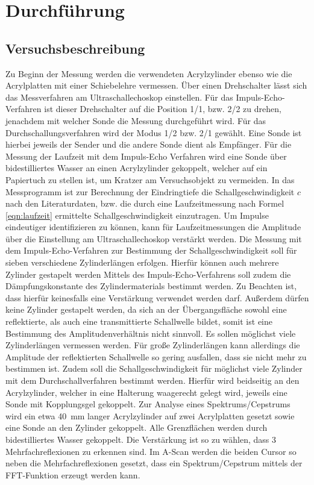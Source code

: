 \section{Durchführung}
\label{sec:Durchführung}



\subsection{Versuchsbeschreibung}
\label{sec:Versuchsbeschreibung}
Zu Beginn der Messung werden die verwendeten Acrylzylinder ebenso wie die Acrylplatten mit einer Schiebelehre vermessen.
Über einen Drehschalter lässt sich das Messverfahren am Ultraschallechoskop einstellen.
Für das Impuls-Echo-Verfahren ist dieser Drehschalter auf die Position 1/1, bzw. 2/2 zu drehen, jenachdem mit welcher Sonde die Messung durchgeführt wird.
Für das Durchschallungsverfahren wird der Modus 1/2 bzw. 2/1 gewählt.
Eine Sonde ist hierbei jeweils der Sender und die andere Sonde dient als Empfänger.
Für die Messung der Laufzeit mit dem Impuls-Echo Verfahren wird eine Sonde über bidestilliertes Wasser an einen Acrylzylinder gekoppelt, welcher auf ein Papiertuch zu stellen ist, um Kratzer am Versuchsobjekt zu vermeiden.
In das Messprogramm ist zur Berechnung der Eindringtiefe die Schallgeschwindigkeit $c$ nach den Literaturdaten, bzw. die durch eine Laufzeitmessung nach Formel \eqref{eqn:laufzeit} ermittelte Schallgeschwindigkeit einzutragen.
Um Impulse eindeutiger identifizieren zu können, kann für Laufzeitmessungen die Amplitude über die Einstellung am Ultraschallechoskop verstärkt werden.
Die Messung mit dem Impuls-Echo-Verfahren zur Bestimmung der Schallgeschwindigkeit soll für sieben verschiedene Zylinderlängen erfolgen. Hierfür können auch mehrere Zylinder gestapelt werden
Mittels des Impuls-Echo-Verfahrens soll zudem die Dämpfungskonstante des Zylindermaterials bestimmt werden. Zu Beachten ist, dass hierfür keinesfalls eine Verstärkung verwendet werden darf. Außerdem dürfen keine Zylinder gestapelt werden, da sich an der Übergangsfläche sowohl eine reflektierte, als auch eine transmittierte Schallwelle bildet, somit ist eine Bestimmung des Amplitudenverhältnis nicht sinnvoll.
Es sollen möglichst viele Zylinderlängen vermessen werden. Für große Zylinderlängen kann allerdings die Amplitude der reflektierten Schallwelle so gering ausfallen, dass sie nicht mehr zu bestimmen ist.
Zudem soll die Schallgeschwindigkeit für möglichst viele Zylinder mit dem Durchschallverfahren bestimmt werden. Hierfür wird beidseitig an den Acrylzylinder, welcher in eine Halterung waagerecht gelegt wird, jeweils eine Sonde mit Kopplungsgel gekoppelt.
Zur Analyse eines Spektrums/Cepstrums wird ein etwa \SI{40}{\milli\meter} langer Acrylzylinder auf zwei Acrylplatten gesetzt sowie eine Sonde an den Zylinder gekoppelt.
Alle Grenzflächen werden durch bidestilliertes Wasser gekoppelt. Die Verstärkung ist so zu wählen, dass 3 Mehrfachreflexionen zu erkennen sind.
Im A-Scan werden die beiden Cursor so neben die Mehrfachreflexionen gesetzt, dass ein Spektrum/Cepstrum mittels der FFT-Funktion erzeugt werden kann.

